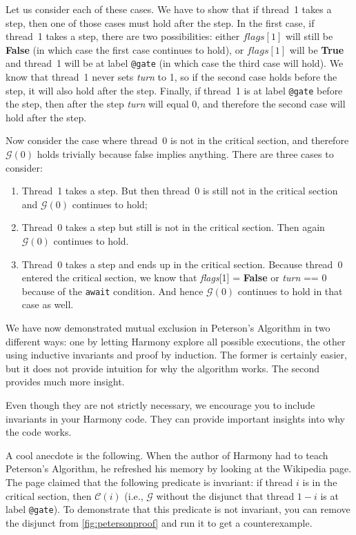 \documentclass{report}
\begin{document}
Let us consider each of these cases.
We have to show that if thread~1 takes a step, then one of those
cases must hold after the step.
In the first case, if thread~1 takes a step, there are two possibilities:
either $flags[1]$ will still be \textbf{False} (in which case the first case
continues to hold), or $flags[1]$ will be \textbf{True}
and thread~1 will be at label \texttt{@gate} (in which case the third case
will hold).
We know that thread~1 never sets \textit{turn} to 1, so
if the second case holds before the step, it will also hold after the step.
Finally, if thread~1 is at label \texttt{@gate} before the step, then after
the step \textit{turn} will equal 0, and therefore the second case will hold
after the step.

Now consider the case where thread~0 is not in the critical section,
and therefore $\mathcal{G}(0)$ holds trivially because false implies
anything.
There are three cases to consider:
\begin{enumerate}
\item Thread~1 takes a step.  But then thread~0 is still not in the critical
section and $\mathcal{G}(0)$ continues to hold;
\item Thread~0 takes a step but still is not in the critical section.
Then again $\mathcal{G}(0)$ continues to hold.
\item Thread~0 takes a step and ends up in the critical section.
Because thread~0 entered the critical section, we know that
\textit{flags}[1] = \textbf{False} or \textit{turn} == 0 because
of the \texttt{await} condition.
And hence $\mathcal{G}(0)$ continues to hold in that case as well.
\end{enumerate}

We have now demonstrated mutual exclusion in Peterson's Algorithm in two
different ways: one by letting Harmony explore all possible executions, the
other using inductive invariants and proof by induction.  The former
is certainly easier, but it does not provide intuition for why the
algorithm works.  The second provides much more insight.

Even though they are not strictly necessary, we encourage you
to include invariants in your Harmony code.
They can provide important insights into why the code works.

A cool anecdote is the following.  When the author of Harmony had to teach
Peterson's Algorithm, he refreshed his memory by looking at the Wikipedia
page.  The page claimed that the following predicate is invariant:
if thread $i$ is in the critical section, then $\mathcal{C}(i)$ (i.e.,
$\mathcal{G}$ without the disjunct that thread $1-i$ is at label \texttt{@gate}).
To demonstrate that this predicate is not invariant, you can remove the
disjunct from \autoref{fig:petersonproof} and run it to get a
counterexample.
\end{document}
